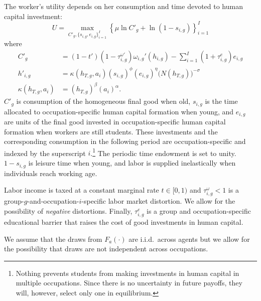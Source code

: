 \documentclass[onehalfspacing,11pt]{article}
\begin{document}
The worker's utility depends on her consumption and time devoted to human capital investment:
\begin{equation}
U = \max_{C'_{g},\{s_{i,g},e_{i,g}\}_{i=1}^I} \left\{\mu \ln C'_{g} + \ln\left(1-s_{i,g} \right) \label{eq:util} \right\}_{i=1}^I
\end{equation}
where
\begin{align}
\label{}
C'_{g} & =(1-t')(1-\tau^{\omega '}_{i,g})\omega_{i,g}'(h_{i,g})- \sum_{i=1}^I(1+\tau^e_{i,g})e_{i,g} \label{eq:bc}\\ %
h'_{i,g} & =\kappa(h_{T,g},a_i)(s_{i,g})^{\phi} (e_{i,g})^{\eta}\big(N(h_{T,g})\big)^{-\sigma} \label{eq:h}\\
\kappa(h_{T,g},a_i) & =(h_{T,g})^\beta \left(a_i \right)^\alpha. \label{eq:g(h,a)}
\end{align}
$C'_{g}$ is consumption of the homogeneous final good when old, $s_{i,g}$ is the time allocated to occupation-specific human capital formation when young, and $e_{i,g}$ are units of the final good invested in occupation-specific human capital formation when workers are still students. These investments and the corresponding consumption in the following period are occupation-specific and indexed by the superscript $i$.\footnote{Nothing prevents students from making investments in human capital in multiple occupations. Since there is no uncertainty in future payoffs, they will, however, select only one in equilibrium.} The periodic time endowment is set to unity. $1-s_{i,g}$ is leisure time when young, and labor is supplied inelastically when individuals reach working age.

Labor income is taxed at a constant marginal rate $t \in [0,1)$ and $\tau^\omega_{i,g} < 1$ is a group-$g$-and-occupation-$i$-specific labor market distortion. We allow for the possibility of {\it negative} distortions. Finally, $\tau^e_{i,g}$ is a group and occupation-specific educational barrier that raises the cost of good investments in human capital.


We assume that the draws from $F_a \left( \cdot \right)$ are i.i.d.~across agents but we allow for the possibility that draws are not independent across occupations.
\end{document}
